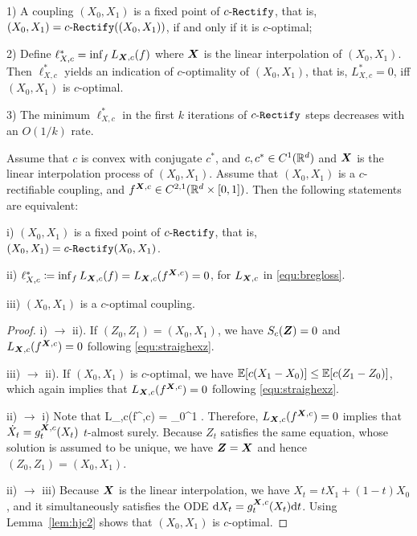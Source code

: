 1) A coupling $(X_0,X_1)$ is a 
fixed point of 
$c\text{-}\mathtt{Rectify}$, that is, $(X_0,X_1) = c\text{-}\mathtt{Rectify}((X_0,X_1))$, if and only if it is  $c$-optimal; 

2) Define $\ell^*_{X,c} = \inf_f L_{{{\boldsymbol{X}}},c}(f)$ where ${\boldsymbol{X}}$ is the linear interpolation of $(X_0,X_1)$. 
Then $\ell^*_{X,c}$ yields an indication of $c$-optimality of $(X_0,X_1)$, that is, $L_{X,c}^*=0$, iff $(X_0,X_1)$ is $c$-optimal. 

3) The minimum $\ell^*_{X,c}$ in the first $k$ iterations of  $c\text{-}\mathtt{Rectify}$ steps decreases  
with an $O(1/k)$ rate. 


\begin{thm}\label{thm:copt}
Assume that $c$ is {convex} with conjugate $c^*$, and $c, c^*\in C^1(\mathbb{R}^d)$ and   ${\boldsymbol{X}}$ is the linear interpolation process of $(X_0,X_1)$. 
 Assume that $(X_0,X_1)$ is a $c$-rectifiable coupling, 
 and  $f^{{{\boldsymbol{X}}},c} \in C^{2,1}(\mathbb{R}^d\times [0,1])$.   
 Then the following statements are equivalent: 
 
 i) $(X_0,X_1)$ is a fixed point of $c\text{-}\mathtt{Rectify}$, that is, $(X_0,X_1) =
 c\text{-}\mathtt{Rectify}(X_0,X_1)$. 
 
  ii)  $ \ell^*_{X,c}\coloneqq \inf_{f} L_{{{\boldsymbol{X}}},c}(f)  = L_{{{\boldsymbol{X}}},c}(f^{{{\boldsymbol{X}}},c}) = 0$, for $L_{{{\boldsymbol{X}}},c}$ in \eqref{equ:bregloss}. 
 
 iii) $(X_0,X_1)$ is a $c$-optimal coupling.
\end{thm}
\begin{proof}

i) $\to$ ii). 
If $(Z_0,Z_1) = (X_0,X_1)$, we have $S_c({\boldsymbol{Z}})=0$ and $L_{{{\boldsymbol{X}}},c}(f^{{{\boldsymbol{X}}},c}) = 0$ following \eqref{equ:straighexz}. 

iii) $\to$ ii). 
If $(X_0,X_1)$ is $c$-optimal, we have $\mathbb{E}[c(X_1-X_0)] \leq \mathbb{E}[c(Z_1-Z_0)]$, which again implies that $L_{{{\boldsymbol{X}}},c}(f^{{{\boldsymbol{X}}},c}) =0$ following \eqref{equ:straighexz}. 


ii) $\to$ i) 
Note that 
\bb 
L_{\X,c}(f^{\X,c}) = 
\int_0^1 \dt 
{}.
\ee 
Therefore, $L_{{{\boldsymbol{X}}},c}(f^{{{\boldsymbol{X}}},c}) =0$ 
implies that 
$\dot X_t= g^{{{\boldsymbol{X}}},c}_t(X_t)$ 
$t$-almost surely. Because $Z_t$ satisfies the same equation, whose solution is assumed to be unique, we have ${\boldsymbol{Z}} ={\boldsymbol{X}}$ and hence $(Z_0,Z_1) = (X_0,X_1)$. 

ii) $\to$ iii)
Because ${\boldsymbol{X}}$ is the linear interpolation, we have $X_t = t X_1 + (1-t) X_0$, and {it simultaneously satisfies the ODE $\mathrm{d} X_t= g^{{{\boldsymbol{X}}},c}_t(X_t) \mathrm{d}t $}.  
Using Lemma~\ref{lem:hjc2} shows that $(X_0,X_1)$ is $c$-optimal. 
\end{proof}


